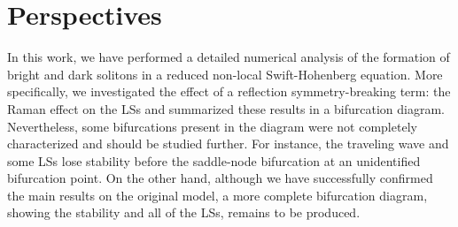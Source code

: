 

\section{Perspectives}

In this work, we have performed a detailed numerical analysis of the formation
of bright and dark solitons in a reduced non-local Swift-Hohenberg equation. More specifically,
we investigated the effect of a reflection symmetry-breaking term: the Raman effect on 
the LSs and summarized these results in a bifurcation diagram. Nevertheless, some bifurcations
present in the diagram were not completely characterized and should be studied further. 
For instance, the traveling 
wave and some LSs lose stability before the saddle-node bifurcation at an unidentified
bifurcation point. On the other hand, although we have successfully confirmed the main results
on the original model, a more complete bifurcation diagram, showing the stability and all of the LSs, 
remains
to be produced.
